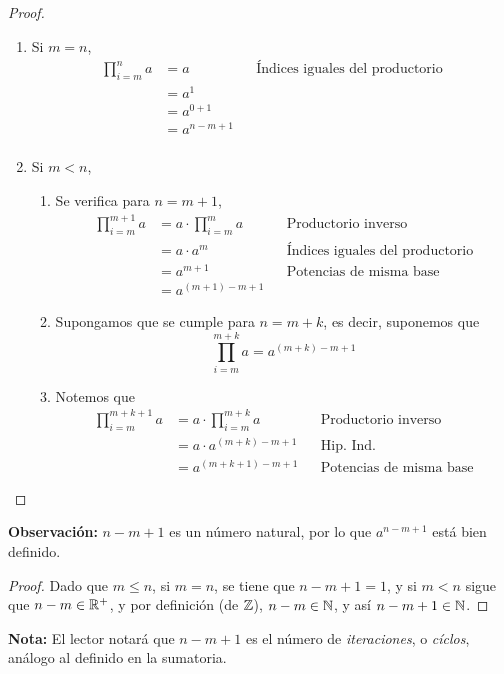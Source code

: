 \begin{proof}\leavevmode
  \begin{enumerate}[label=\Roman*)]
    \item Si $m=n$, 
    \begin{align*}
      \prod_{i=m}^{n} a &= a && \text{Índices iguales del productorio}\\
      &= a^1\\
      &= a^{0+1}\\
      &= a^{n-m+1}\\
    \end{align*}
    \item Si $m<n$,
    \begin{enumerate}[label=\roman*)]
      \item Se verifica para $n=m+1$,
      \begin{align*}
        \prod_{i=m}^{m+1} a &= a\cdot \prod_{i=m}^{m} a && \text{Productorio inverso}\\
        &= a \cdot a^m && \text{Índices iguales del productorio}\\
        &= a^{m+1} && \text{Potencias de misma base}\\
        &= a^{(m+1)-m+1}
      \end{align*}
      \item Supongamos que se cumple para $n=m+k$, es decir, suponemos que \[\prod_{i=m}^{m+k} a = a^{(m+k)-m+1}\]
      \item Notemos que
      \begin{align*}
        \prod_{i=m}^{m+k+1} a &= a\cdot \prod_{i=m}^{m+k} a && \text{Productorio inverso}\\
        &= a\cdot a^{(m+k)-m+1} && \text{Hip. Ind.}\\
        &= a^{(m+k+1)-m+1} && \text{Potencias de misma base}
      \end{align*}
    \end{enumerate}
  \end{enumerate}
\end{proof}

\textbf{Observación:} $n-m+1$ es un número natural, por lo que $a^{n-m+1}$ está bien definido.
\begin{proof}\leavevmode
  Dado que $m\leq n$, si $m=n$, se tiene que $n-m+1=1$, y si $m<n$ sigue que $n-m\in \mathbb{R}^+$, y por definición (de $\mathbb{Z}$), $n-m\in \mathbb{N}$, y así $n-m+1\in \mathbb{N}$.
\end{proof}

\textbf{Nota:} El lector notará que $n-m+1$ es el número de \textit{iteraciones}, o \textit{cíclos}, análogo al definido en la sumatoria.
  
